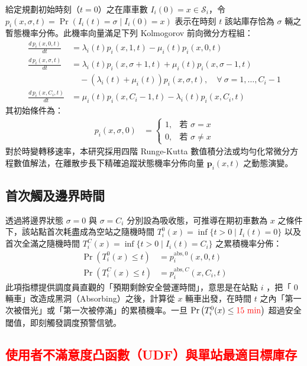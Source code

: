 給定規劃初始時刻（$t = 0$）之在庫車數 $I_i(0) = x \in \mathcal{S}_i$，令 $p_i(x, \sigma, t) = \Pr\left(I_i(t) = \sigma \mid I_i(0) = x\right)$ 表示在時刻 $t$ 該站庫存恰為 $\sigma$ 輛之暫態機率分佈。此機率向量滿足下列 Kolmogorov 前向微分方程組：
\begin{align}
\frac{d\, p_i(x, 0, t)}{dt} &= \lambda_i(t) p_i(x, 1, t) - \mu_i(t) p_i(x, 0, t) \\
\frac{d\, p_i(x, \sigma, t)}{dt} &= \lambda_i(t) p_i(x, \sigma+1, t) + \mu_i(t) p_i(x, \sigma-1, t) \\
&\quad - \left(\lambda_i(t) + \mu_i(t)\right) p_i(x, \sigma, t), \quad \forall\ \sigma = 1, \dots, C_i - 1 \tag*{} \\ 
\frac{d\, p_i(x, C_i, t)}{dt} &= \mu_i(t) p_i(x, C_i-1, t) - \lambda_i(t) p_i(x, C_i, t)
\end{align}
其初始條件為：
\begin{align}
p_i(x, \sigma, 0) &= \begin{cases}
1, & \text{若 } \sigma = x \\
0, & \text{若 } \sigma \ne x
\end{cases}
\end{align}
對於時變轉移速率，本研究採用四階 Runge-Kutta 數值積分法或均勻化常微分方程數值解法，在離散步長下精確追蹤狀態機率分佈向量 $\mathbf{p}_i(x, t)$ 之動態演變。

\subsection{首次觸及邊界時間}

透過將邊界狀態 $\sigma = 0$ 與 $\sigma = C_i$ 分別設為吸收態，可推導在期初車數為 $x$ 之條件下，該站點首次耗盡成為空站之隨機時間 $T^0_i(x) = \inf\{t > 0 \mid I_i(t) = 0\}$ 以及首次全滿之隨機時間 $T^C_i(x) = \inf\{t > 0 \mid I_i(t) = C_i\}$ 之累積機率分佈：
\begin{align}
\Pr\left(T^0_i(x) \le t\right) &= p^{\text{abs}, 0}_i(x, 0, t) \\
\Pr\left(T^C_i(x) \le t\right) &= p^{\text{abs}, C}_i(x, C_i, t)
\end{align}
此項指標提供調度員直觀的「預期剩餘安全營運時間」，意思是在站點 $i$ ，把「 0 輛車」改造成黑洞（Absorbing）之後，計算從 $x$ 輛車出發，在時間 $t$ 之內「第一次被借光」或「第一次被停滿」的累積機率。一旦 $\Pr\left(T^0_i(x) \le \textcolor{red}{15\text{ min}}\right)$ 超過安全閾值，即刻觸發調度預警信號。

\subsection{\textcolor{red}{使用者不滿意度凸函數（UDF）與單站最適目標庫存}}

